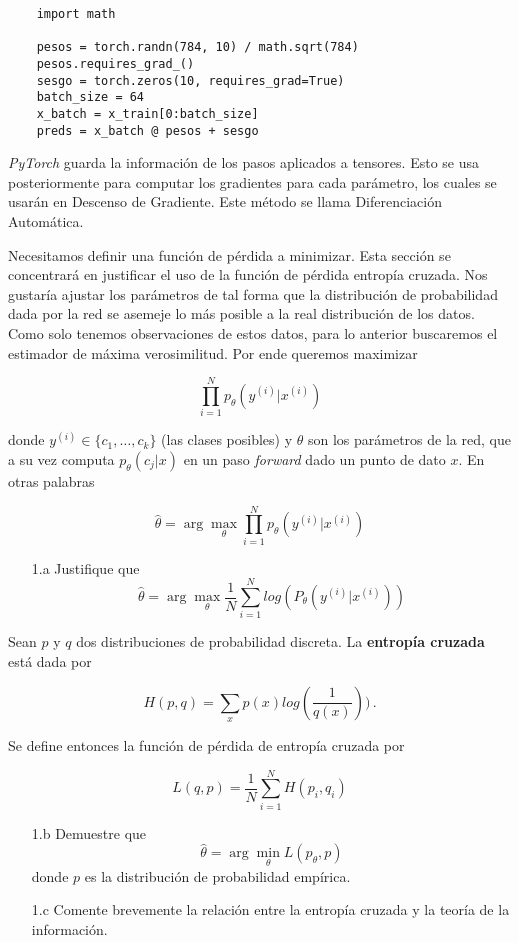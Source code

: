 \begin{verbatim}
    import math

    pesos = torch.randn(784, 10) / math.sqrt(784)
    pesos.requires_grad_()
    sesgo = torch.zeros(10, requires_grad=True)
    batch_size = 64
    x_batch = x_train[0:batch_size]
    preds = x_batch @ pesos + sesgo
\end{verbatim}

\textit{PyTorch} guarda la información de los pasos aplicados a tensores. Esto se usa posteriormente para computar los gradientes para cada parámetro, los cuales se usarán en Descenso de Gradiente. Este método se llama Diferenciación Automática.

\newp Necesitamos definir una función de pérdida a minimizar. Esta sección se concentrará en justificar el uso de la función de pérdida entropía cruzada. Nos gustaría ajustar los parámetros de tal forma que la distribución de probabilidad dada por la red se asemeje lo más posible a la real distribución de los datos. Como solo tenemos observaciones de estos datos, para lo anterior buscaremos el estimador de máxima verosimilitud. Por ende queremos maximizar

$$ \prod^N_{i=1}p_\theta(y^{(i)}|x^{(i)})$$

donde $y^{(i)}\in\{c_1,\dots,c_k\}$ (las clases posibles) y $\theta$ son los parámetros de la red, que a su vez computa $p_\theta(c_j|x)$ en un paso \textit{forward} dado un punto de dato $x$. En otras palabras

$$ \hat\theta = \arg\max_\theta \prod^N_{i=1}p_\theta(y^{(i)}|x^{(i)}) $$

\begin{enumerate}
	\item[1.a] Justifique que
    $$ \hat\theta = \arg\max_\theta \frac{1}{N} \sum^N_{i=1} log(P_\theta(y^{(i)}|x^{(i)})) $$
\end{enumerate}

Sean $p$ y $q$ dos distribuciones de probabilidad discreta. La \textbf{entropía cruzada} está dada por 

$$ H(p,q) = \sum_x p(x) log(\frac{1}{q(x)})) \,.$$

Se define entonces la función de pérdida de entropía cruzada por

$$ L(q,p) = \frac{1}{N}\sum^N_{i=1}H(p_i,q_i) $$

\begin{enumerate}
    \item[1.b] Demuestre que
    $$ \hat\theta = \arg\min_\theta L(p_\theta,p)$$
    donde $p$ es la distribución de probabilidad empírica.
    \item[1.c] Comente brevemente la relación entre la entropía cruzada y la teoría de la información.
\end{enumerate}

